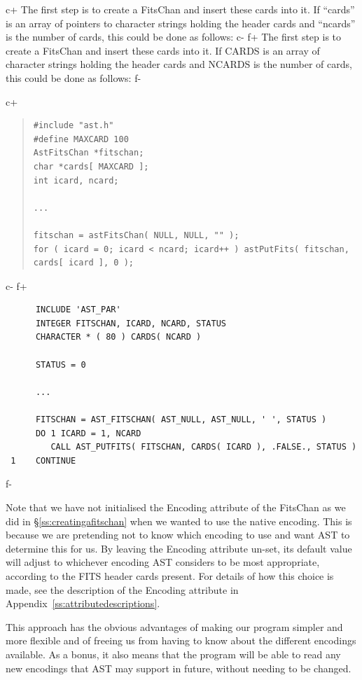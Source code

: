 \documentclass[twoside,11pt]{article}
\newcommand{\appref}[1]{Appendix~\ref{#1}}
\newcommand{\secref}[1]{\S\ref{#1}}
\newcommand{\appref}[1]{\ref{#1}}
\newcommand{\secref}[1]{\ref{#1}}
\begin{document}
c+
The first step is to create a FitsChan and insert these cards into
it. If ``cards'' is an array of pointers to character strings holding
the header cards and ``ncards'' is the number of cards, this could be
done as follows:
c-
f+
The first step is to create a FitsChan and insert these cards into
it. If CARDS is an array of character strings holding the header cards
and NCARDS is the number of cards, this could be done as follows:
f-

c+
\begin{quote}
\small
\begin{verbatim}
#include "ast.h"
#define MAXCARD 100
AstFitsChan *fitschan;
char *cards[ MAXCARD ];
int icard, ncard;

...

fitschan = astFitsChan( NULL, NULL, "" );
for ( icard = 0; icard < ncard; icard++ ) astPutFits( fitschan, cards[ icard ], 0 );
\end{verbatim}
\normalsize
\end{quote}
c-
f+
\small
\begin{verbatim}
      INCLUDE 'AST_PAR'
      INTEGER FITSCHAN, ICARD, NCARD, STATUS
      CHARACTER * ( 80 ) CARDS( NCARD )

      STATUS = 0

      ...

      FITSCHAN = AST_FITSCHAN( AST_NULL, AST_NULL, ' ', STATUS )
      DO 1 ICARD = 1, NCARD
         CALL AST_PUTFITS( FITSCHAN, CARDS( ICARD ), .FALSE., STATUS )
 1    CONTINUE
\end{verbatim}
\normalsize
f-

Note that we have not initialised the Encoding attribute of the
FitsChan as we did in \secref{ss:creatingafitschan} when we wanted to
use the native encoding. This is because we are pretending not to know
which encoding to use and want AST to determine this for us. By
leaving the Encoding attribute un-set, its default value will adjust
to whichever encoding AST considers to be most appropriate, according
to the FITS header cards present. For details of how this choice is
made, see the description of the Encoding attribute in
\appref{ss:attributedescriptions}.

This approach has the obvious advantages of making our program simpler
and more flexible and of freeing us from having to know about the
different encodings available. As a bonus, it also means that the
program will be able to read any new encodings that AST may support in
future, without needing to be changed.
\end{document}
